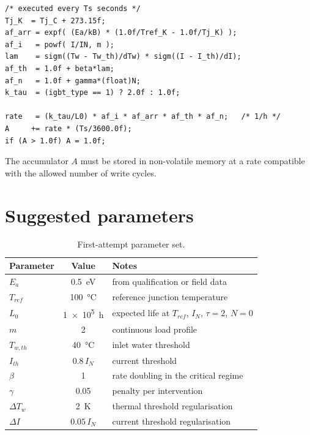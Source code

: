 \documentclass[11pt,a4paper]{article}
\begin{document}
\begin{lstlisting}[caption={Pseudo-code for embedded implementation.}]
/* executed every Ts seconds */
Tj_K  = Tj_C + 273.15f;
af_arr = expf( (Ea/kB) * (1.0f/Tref_K - 1.0f/Tj_K) );
af_i   = powf( I/IN, m );
lam    = sigm((Tw - Tw_th)/dTw) * sigm((I - I_th)/dI);
af_th  = 1.0f + beta*lam;
af_n   = 1.0f + gamma*(float)N;
k_tau  = (igbt_type == 1) ? 2.0f : 1.0f;

rate   = (k_tau/L0) * af_i * af_arr * af_th * af_n;   /* 1/h */
A     += rate * (Ts/3600.0f);
if (A > 1.0f) A = 1.0f;
\end{lstlisting}

The accumulator $A$ must be stored in non-volatile memory at a rate compatible
with the allowed number of write cycles.

\section{Suggested parameters}

\begin{table}[h]
\centering
\begin{tabular}{lcl}
\toprule
Parameter & Value & Notes \\
\midrule
$E_a$      & \SI{0.5}{\electronvolt} & from qualification or field data \\
$T_{ref}$  & \SI{100}{\degreeCelsius} & reference junction temperature \\
$L_0$      & \SI{1e5}{\hour}          & expected life at $T_{ref}$, $I_N$, $\tau=2$, $N=0$ \\
$m$        & 2                        & continuous load profile \\
$T_{w,th}$ & \SI{40}{\degreeCelsius}  & inlet water threshold \\
$I_{th}$   & $0.8\,I_N$               & current threshold \\
$\beta$    & 1                        & rate doubling in the critical regime \\
$\gamma$   & 0.05                     & penalty per intervention \\
$\Delta T_w$ & \SI{2}{\kelvin}        & thermal threshold regularisation \\
$\Delta I$ & $0.05\,I_N$              & current threshold regularisation \\
\bottomrule
\end{tabular}
\caption{First-attempt parameter set.}
\end{table}
\end{document}
